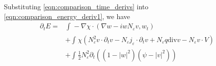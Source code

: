 \documentclass[a4paper]{article}
\newcommand{\curl}{\mathrm{curl}}
\renewcommand{\div}{\mathrm{div}}
\begin{document}
Substituting \eqref{eqn:comparison_time_derivs} into \eqref{eqn:comparison_energy_deriv1}, we have
\begin{align}
  \partial_t E = &\int_{}^{} - \nabla \chi \cdot ( \nabla w - i w N_\varepsilon v, w_t) \nonumber \\
  &+ \int_{}^{} \chi (N_\varepsilon^2 v \cdot \partial_t v - N_\varepsilon j_\varepsilon \cdot \partial_t v + N_\varepsilon q \div v - N_\varepsilon v
  \cdot V ) \nonumber \\
  &+ \int_{}^{} \frac{1}{2} N_\varepsilon^2 \partial_t ( (1-|w|^2)(\psi - |v|^2) )
  \label{eqn:comparison_energy_deriv2}
\end{align}

\end{document}
